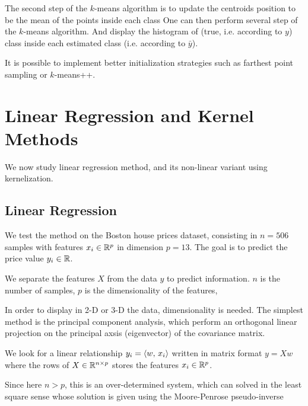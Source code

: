 The second step of the $k$-means algorithm is to update the centroids
position to be the mean of the points inside each class
One can then perform several step of the $k$-means algorithm. 
And display the histogram of (true, i.e. according to $y$) class  inside
each estimated class (i.e. according to $\bar y$).




It is possible to implement better initialization strategies such as farthest point sampling or $k$-means++.



\section{Linear Regression and Kernel Methods}

We now study linear regression method, and its non-linear variant using kernelization.

\subsection{Linear Regression}

We test the method on the Boston house prices dataset, consisting in $n=506$ samples with
features $x_i \in \mathbb{R}^p$ in dimension $p=13$. The goal is to predict the price value
$y_i \in \mathbb{R}$. 

We separate the features $X$ from the data $y$ to predict information.
$n$ is the number of samples, $p$ is the dimensionality of the features,

In order to display in 2-D or 3-D the data, dimensionality is needed.
The simplest method is the principal component analysis, which perform an
orthogonal linear projection on the principal axsis (eigenvector) of the
covariance matrix.

We look for a linear relationship $ y_i = \langle w,\,x_i\rangle $
written in matrix format $ y= X w $
where the rows of $X \in \mathbb{R}^{n \times p}$ stores the features $x_i \in \mathbb{R}^p$.

Since here $n>p$, this is an over-determined system, which can
solved in the least square sense
whose solution is given using the Moore-Penrose pseudo-inverse

